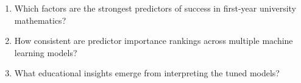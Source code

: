 \begin{enumerate}
\item Which factors are the strongest predictors of success in first-year university mathematics?
\item How consistent are predictor importance rankings across multiple machine learning models?
\item What educational insights emerge from interpreting the tuned models?
\end{enumerate}
